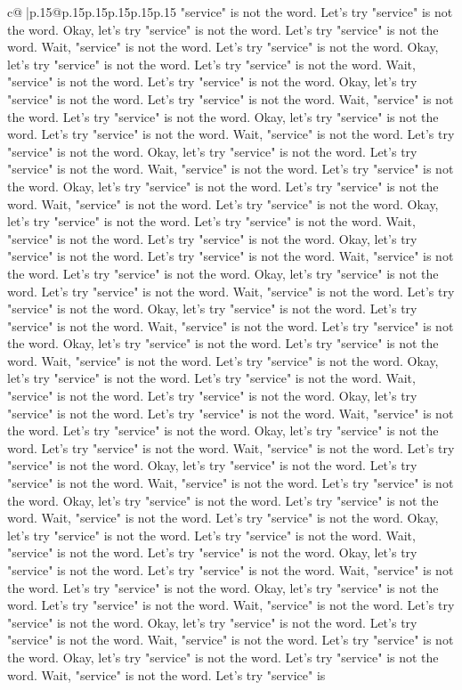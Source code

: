 \documentclass{article}
\begin{document}
{\begin{supertabular}{c@{$\;$}|p{.15\linewidth}@{}p{.15\linewidth}p{.15\linewidth}p{.15\linewidth}p{.15\linewidth}p{.15\linewidth}}
{{{"service" is not the word. Let's try "service" is not the word. Okay, let's try "service" is not the word. Let's try "service" is not the word. Wait, "service" is not the word. Let's try "service" is not the word. Okay, let's try "service" is not the word. Let's try "service" is not the word. Wait, "service" is not the word. Let's try "service" is not the word. Okay, let's try "service" is not the word. Let's try "service" is not the word. Wait, "service" is not the word. Let's try "service" is not the word. Okay, let's try "service" is not the word. Let's try "service" is not the word. Wait, "service" is not the word. Let's try "service" is not the word. Okay, let's try "service" is not the word. Let's try "service" is not the word. Wait, "service" is not the word. Let's try "service" is not the word. Okay, let's try "service" is not the word. Let's try "service" is not the word. Wait, "service" is not the word. Let's try "service" is not the word. Okay, let's try "service" is not the word. Let's try "service" is not the word. Wait, "service" is not the word. Let's try "service" is not the word. Okay, let's try "service" is not the word. Let's try "service" is not the word. Wait, "service" is not the word. Let's try "service" is not the word. Okay, let's try "service" is not the word. Let's try "service" is not the word. Wait, "service" is not the word. Let's try "service" is not the word. Okay, let's try "service" is not the word. Let's try "service" is not the word. Wait, "service" is not the word. Let's try "service" is not the word. Okay, let's try "service" is not the word. Let's try "service" is not the word. Wait, "service" is not the word. Let's try "service" is not the word. Okay, let's try "service" is not the word. Let's try "service" is not the word. Wait, "service" is not the word. Let's try "service" is not the word. Okay, let's try "service" is not the word. Let's try "service" is not the word. Wait, "service" is not the word. Let's try "service" is not the word. Okay, let's try "service" is not the word. Let's try "service" is not the word. Wait, "service" is not the word. Let's try "service" is not the word. Okay, let's try "service" is not the word. Let's try "service" is not the word. Wait, "service" is not the word. Let's try "service" is not the word. Okay, let's try "service" is not the word. Let's try "service" is not the word. Wait, "service" is not the word. Let's try "service" is not the word. Okay, let's try "service" is not the word. Let's try "service" is not the word. Wait, "service" is not the word. Let's try "service" is not the word. Okay, let's try "service" is not the word. Let's try "service" is not the word. Wait, "service" is not the word. Let's try "service" is not the word. Okay, let's try "service" is not the word. Let's try "service" is not the word. Wait, "service" is not the word. Let's try "service" is not the word. Okay, let's try "service" is not the word. Let's try "service" is not the word. Wait, "service" is not the word. Let's try "service" is not the word. Okay, let's try "service" is not the word. Let's try "service" is not the word. Wait, "service" is not the word. Let's try "service" is }}}
\end{supertabular}}
\end{document}
